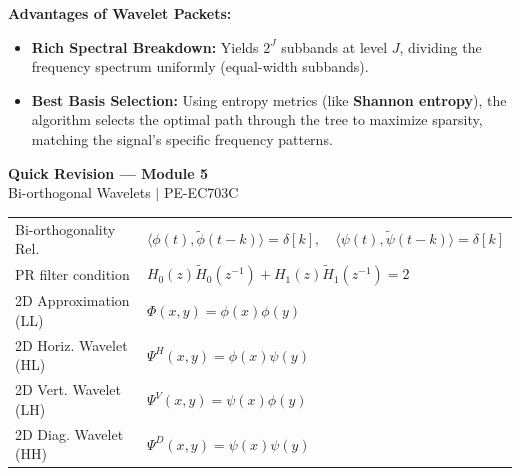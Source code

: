 \documentclass[12pt,a4paper]{article}
\renewcommand{\arraystretch}{1.45}
\begin{document}
\textbf{Advantages of Wavelet Packets:}
\begin{itemize}[leftmargin=*, itemsep=4.5pt]
  \item \textbf{Rich Spectral Breakdown:} Yields $2^J$ subbands at level $J$, dividing the frequency spectrum uniformly (equal-width subbands).
  \item \textbf{Best Basis Selection:} Using entropy metrics (like \textbf{Shannon entropy}), the algorithm selects the optimal path through the tree to maximize sparsity, matching the signal's specific frequency patterns.
\end{itemize}

\newpage
\begin{center}
  {\large\bfseries\color{myred} Quick Revision --- Module 5}\\[3pt]
  {\small\color{mydark} Bi-orthogonal Wavelets $|$ PE-EC703C}
\end{center}
\noindent{\color{myred}\rule{\linewidth}{1.2pt}}
\vspace{4pt}

\begin{tcolorbox}[formulabox, title={\textbf{Key Equations}}]
\renewcommand{\arraystretch}{1.35}
\begin{tabularx}{\linewidth}{B{5.0cm} X}
Bi-orthogonality Rel. & $\langle \phi(t), \tilde{\phi}(t-k) \rangle = \delta[k], \quad \langle \psi(t), \tilde{\psi}(t-k) \rangle = \delta[k]$ \\[4pt]
PR filter condition & $H_0(z)\tilde{H}_0(z^{-1}) + H_1(z)\tilde{H}_1(z^{-1}) = 2$ \\[4pt]
2D Approximation (LL) & $\Phi(x,y) = \phi(x)\phi(y)$ \\[4pt]
2D Horiz. Wavelet (HL) & $\Psi^H(x,y) = \phi(x)\psi(y)$ \\[4pt]
2D Vert. Wavelet (LH) & $\Psi^V(x,y) = \psi(x)\phi(y)$ \\[4pt]
2D Diag. Wavelet (HH) & $\Psi^D(x,y) = \psi(x)\psi(y)$
\end{tabularx}
\end{tcolorbox}
\end{document}
